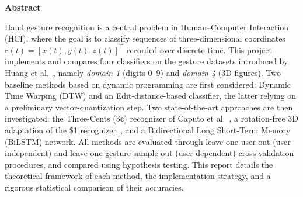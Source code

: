 \begin{center}
  \begin{minipage}{0.75\textwidth}
    \begin{center}
      \textbf{\large Abstract}
    \end{center}
    \vspace{0.8em}
    \noindent Hand gesture recognition is a central problem in Human--Computer
    Interaction (HCI), where the goal is to classify sequences of three-dimensional
    coordinates $\mathbf{r}(t) = [x(t), y(t), z(t)]^{\top}$ recorded over discrete
    time. This project implements and compares four classifiers on the gesture
    datasets introduced by Huang et al.~\cite{Huang2019}, namely \emph{domain 1}
    (digits 0--9) and \emph{domain 4} (3D figures). Two baseline methods based
    on dynamic programming are first considered: Dynamic Time Warping (DTW)
    and an Edit-distance-based classifier, the latter relying on a preliminary
    vector-quantization step. Two state-of-the-art approaches are then
    investigated: the Three-Cents ($3\mathbb{c}$) recognizer of Caputo et al.~\cite{Caputo2018},
    a rotation-free 3D adaptation of the \$1 recognizer~\cite{Wobbrock2007}, and a Bidirectional
    Long Short-Term Memory (BiLSTM) network. All methods are evaluated through leave-one-user-out
    (user-independent) and leave-one-gesture-sample-out (user-dependent)
    cross-validation procedures, and compared using hypothesis testing. This
    report details the theoretical framework of each method, the implementation
    strategy, and a rigorous statistical comparison of their accuracies.
  \end{minipage}
\end{center}
